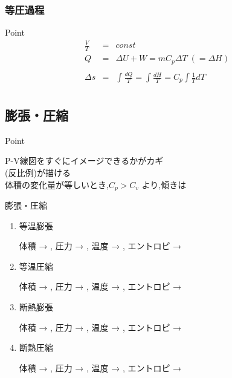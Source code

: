 \documentclass[a4paper]{jsarticle}
\begin{document}
\subsubsection{等圧過程}
\begin{itembox}[l]{Point}
    \begin{eqnarray*}
        \frac{V}{T}&=&const\\
        Q&=&\Delta U + W = mC_p\Delta T \; \left(= \Delta H\right)\\
        \\
        \Delta s&=&\int \frac{dQ}{T} = \int \frac{dH}{T} = C_p\int\frac{1}{T}dT\\
    \end{eqnarray*}
\end{itembox}
\subsection{膨張・圧縮}
\begin{itembox}[l]{Point}
    \begin{center}
        P-V線図をすぐにイメージできるかがカギ\\
        (反比例)が描ける\\
        体積の変化量が等しいとき,$C_p > C_v$ より,傾きは \\
    \end{center}
\end{itembox}
\begin{itembox}[l]{膨張・圧縮}
    \begin{enumerate}[(1)]
        \item 等温膨張
              \begin{center}
                  体積 →  , 圧力 →  , 温度 →  , エントロピ → 
              \end{center}
        \item 等温圧縮
              \begin{center}
                  体積 →  , 圧力 →  , 温度 →  , エントロピ → 
              \end{center}
        \item 断熱膨張
              \begin{center}
                  体積 →  , 圧力 →  , 温度 →   , エントロピ → 
              \end{center}
        \item 断熱圧縮
              \begin{center}
                  体積 →  , 圧力 →  , 温度 →   , エントロピ → 
              \end{center}
    \end{enumerate}
\end{itembox}
\end{document}
